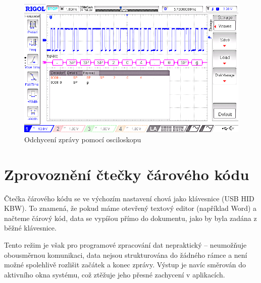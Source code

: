 \begin{figure}[H]
    \begin{center}
        \includegraphics[scale=0.75]{obrazky/DS1Z_QuickPrint6_ostrost.png}
    \end{center}
    \caption{Odchycení zprávy  pomocí osciloskopu}
    \label{osc}
\end{figure}

\section{Zprovoznění čtečky čárového kódu}
\label{zprovozeni_ctecky}

Čtečka čárového kódu se ve výchozím nastavení chová jako klávesnice (USB HID KBW). To znamená, že pokud máme otevřený textový editor (například Word) a načteme čárový kód, data se vypíšou přímo do dokumentu, jako by byla zadána z běžné klávesnice.

Tento režim je však pro programové zpracování dat nepraktický – neumožňuje obousměrnou komunikaci, data nejsou strukturována do žádného rámce a není možné spolehlivě rozlišit začátek a konec zprávy. Výstup je navíc směrován do aktivního okna systému, což ztěžuje jeho přesné zachycení v aplikacích.

